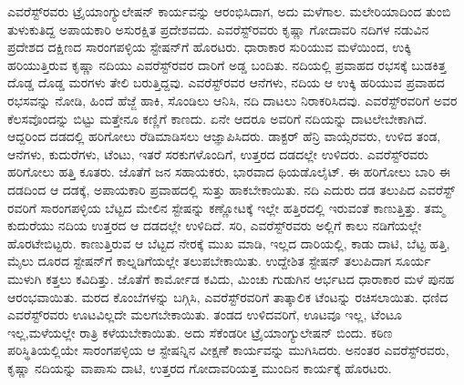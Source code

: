 ಎವರೆಸ್ಟ್​ರವರು ಟ್ರೈಯಾಂಗ್ಯುಲೇಷನ್​ ಕಾರ್ಯವನ್ನು ಆರಂಭಿಸಿದಾಗ, ಅದು ಮಳೆಗಾಲ. ಮಲೇರಿಯಾದಿಂದ ತುಂಬಿ ತುಳುಕುತಿದ್ದ ಅಪಾಯಕಾರಿ ಅಸುರಕ್ಷಿತ ಪ್ರದೇಶವದು. ಎವರೆಸ್ಟ್​ರವರು ಕೃಷ್ಣಾ ಗೋದಾವರಿ ನದಿಗಳ ನಡುವಿನ ಪ್ರದೇಶದ ದಕ್ಷಿಣದ ಸಾರಂಗಪಳ್ಳಿಯ ಸ್ಟೇಷನ್​ಗೆ ಹೊರಟರು. ಧಾರಾಕಾರ ಸುರಿಯುವ ಮಳೆಯಿಂದ, ಉಕ್ಕಿ ಹರಿಯುತ್ತಿರುವ ಕೃಷ್ಣಾ ನದಿಯು ಎವರೆಸ್ಟ್​ರವರ ದಾರಿಗೆ ಅಡ್ಡ ಬಂದಿತು. ನದಿಯಲ್ಲಿ ಪ್ರವಾಹದ ರಭಸಕ್ಕೆ ಬುಡಕಿತ್ತ ದೊಡ್ಡ ದೊಡ್ಡ ಮರಗಳು ತೇಲಿ ಬರುತ್ತಿದ್ದವು. ಎವರೆಸ್ಟ್​ರವರ ಆನೆಗಳು, ನದಿಯ ಆ ಉಕ್ಕಿ ಹರಿಯುವ ಪ್ರವಾಹದ ರಭಸವನ್ನು ನೋಡಿ, ಹಿಂದೆ ಹೆಜ್ಜೆ ಹಾಕಿ, ಸೊಂಡಿಲು ಆನಿಸಿ, ನದಿ ದಾಟಲು ನಿರಾಕರಿಸಿದವು. ಎವರೆಸ್ಟ್​ರವರಿಗೆ ಅವರ ಕೆಲಸವೊಂದನ್ನು ಬಿಟ್ಟು ಮತ್ತೇನೂ ಕಣ್ಣಿಗೆ ಕಾಣದು. ಏನೇ ಆದರೂ ಅವರಿಗೆ ನದಿಯನ್ನು ದಾಟಲೇಬೇಕಾಗಿದೆ. ಆದ್ದರಿಂದ ದಡದಲ್ಲಿ ಹರಿಗೋಲು ರೆಡಿಮಾಡಿಸಲು ಆಜ್ಞಾಪಿಸಿದರು. ಡಾಕ್ಟರ್​ ಹೆನ್ರಿ ವಾಯ್ಸೆರವರು, ಉಳಿದ ತಂಡ, ಆನೆಗಳು, ಕುದುರೆಗಳು, ಟೆಂಟು, ಇತರೆ ಸರಕುಗಳೊಂದಿಗೆ, ಉತ್ತರದ ದಡದಲ್ಲೇ ಉಳಿದರು. ಎವರೆಸ್ಟ್​ರವರು ಹರಿಗೋಲು ಹತ್ತಿ ಕೂತರು. ಜೊತೆಗೆ  ಜನ ಸಹಾಯಕರು, ಭಾರವಾದ ಥಿಯಡೊಲೈಟ್​. ಈ ಹರಿಗೋಲು  ಬಾರಿ ಈ ದಡದಿಂದ ಆ ದಡಕ್ಕೆ, ಅಪಾಯಕಾರಿ ಪ್ರವಾಹದಲ್ಲಿ ಸುತ್ತು ಹಾಕಬೇಕಾಯಿತು. ನದಿ ಎದುರು ದಡ ತಲುಪಿದ ಎವರೆಸ್ಟ್​ರವರಿಗೆ ಸಾರಂಗಪಳ್ಳಿಯ ಬೆಟ್ಟದ ಮೇಲಿನ ಸ್ಟೇಷನ್ನು ಕಣ್ಣೋಟಕ್ಕೆ ಇಲ್ಲೇ ಹತ್ತಿರದಲ್ಲಿ ಇರುವಂತೆ ಕಾಣುತ್ತಿತ್ತು. ತಮ್ಮ ಕುದುರೆಯು ನದಿಯ ಉತ್ತರದ ಆ ದಡದಲ್ಲೇ ಉಳಿದಿದೆ. ಸರಿ, ಎವರೆಸ್ಟ್​ರವರು ಅಲ್ಲಿಗೆ ಕಾಲು ನಡಿಗೆಯಲ್ಲೇ ಹೊರಟೇಬಿಟ್ಟರು. ಕಾಣುತ್ತಿರುವ ಆ ಬೆಟ್ಟದ ನೇರಕ್ಕೆ ಮುಖ ಮಾಡಿ, ಇಲ್ಲದ ದಾರಿಯಲ್ಲಿ, ಕಾಡು ದಾಟಿ, ಬೆಟ್ಟ ಹತ್ತಿ,  ಮೈಲು ದೂರದ ಸ್ಟೇಷನ್​ಗೆ ಕಾಲ್ನಡಿಗೆಯಲ್ಲೇ ತಲುಪಬೇಕಾಯಿತು. ಉದ್ದೇಶಿತ ಸ್ಟೇಷನ್​ ತಲುಪಿದಾಗ ಸೂರ್ಯ ಮುಳುಗಿ ಕತ್ತಲು ಕವಿದಿತ್ತು. ಜೊತೆಗೆ ಕಾರ್ಮೋಡ ಕವಿದು, ಮಿಂಚು ಗುಡುಗಿನ ಆರ್ಭಟದ ಧಾರಾಕಾರ ಮಳೆ ಪುನಹ ಆರಂಭವಾಯಿತು. ಮರದ ಕೊಂಬೆಗಳನ್ನು ಬಗ್ಗಿಸಿ, ಎವರೆಸ್ಟ್​ರವರಿಗೆ ತಾತ್ಕಾಲಿಕ ಟೆಂಟನ್ನು ರಚಿಸಲಾಯಿತು. ಧಣಿದ ಎವರೆಸ್ಟ್​ರವರು ಊಟವಿಲ್ಲದೇ ಮಲಗಬೇಕಾಯಿತು. ತಂಡದ ಉಳಿದವರಿಗೆ, ಊಟವೂ ಇಲ್ಲ, ಟೆಂಟೂ ಇಲ್ಲ,\break ಮಳೆಯಲ್ಲೇ ರಾತ್ರಿ ಕಳೆಯಬೇಕಾಯಿತು. ಅದು ಸೆಕೆಂಡರೀ ಟ್ರೈಯಾಂಗ್ಯುಲೇಷನ್​ ಬಿಂದು. ಕಠಿಣ ಪರಿಸ್ಥಿತಿಯಲ್ಲಿಯೇ ಸಾರಂಗಪಳ್ಳಿಯ ಆ ಸ್ಟೇಷನ್ನಿನ ವೀಕ್ಷಣೆೆ ಕಾರ್ಯವನ್ನು ಮುಗಿಸಿದರು. ಅನಂತರ ಎವರೆಸ್ಟ್​ರವರು, ಕೃಷ್ಣಾ ನದಿಯನ್ನು ವಾಪಾಸು ದಾಟಿ, ಉತ್ತರದ ಗೋದಾವರಿಯತ್ತ ಮುಂದಿನ ಕಾರ್ಯಕ್ಕೆ ಹೊರಟರು.


